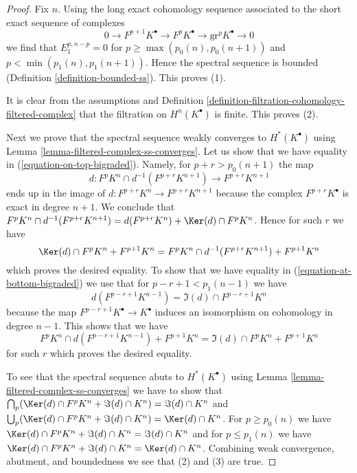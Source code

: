 \begin{proof}
Fix $n$. Using the long exact cohomology sequence associated to
the short exact sequence of complexes
$$
0 \to F^{p + 1}K^\bullet \to F^pK^\bullet \to \text{gr}^pK^\bullet \to 0
$$
we find that $E_1^{p, n - p} = 0$ for $p \geq \max(p_0(n), p_0(n + 1))$ and
$p < \min(p_1(n), p_1(n + 1))$. Hence the spectral sequence is bounded
(Definition \ref{definition-bounded-ss}). This proves (1).

\medskip\noindent
It is clear from the assumptions and
Definition \ref{definition-filtration-cohomology-filtered-complex}
that the filtration on $H^n(K^\bullet)$ is finite. This proves (2).

\medskip\noindent
Next we prove that the spectral sequence weakly converges to
$H^*(K^\bullet)$ using
Lemma \ref{lemma-filtered-complex-ss-converges}.
Let us show that we have equality in (\ref{equation-on-top-bigraded}).
Namely, for $p + r > p_0(n + 1)$ the map
$$
d : F^pK^{n} \cap d^{-1}(F^{p + r}K^{n + 1}) \to F^{p + r}K^{n + 1}
$$
ends up in the image of $d : F^{p + r}K^n \to F^{p + r}K^{n + 1}$
because the complex $F^{p + r}K^\bullet$ is exact in degree $n + 1$.
We conclude that $F^pK^{n} \cap d^{-1}(F^{p + r}K^{n + 1}) =
d(F^{p + r}K^n) + \Ker(d) \cap F^pK^n$. Hence for such $r$ we have
$$
\Ker(d) \cap F^pK^{n} + F^{p + 1}K^{n} =
F^pK^{n} \cap d^{-1}(F^{p + r}K^{n + 1}) + F^{p + 1}K^{n}
$$
which proves the desired equality. To show that we have equality in
(\ref{equation-at-bottom-bigraded}) we use that for $p - r + 1 < p_1(n - 1)$
we have
$$
d(F^{p - r + 1}K^{n - 1}) = \Im(d) \cap F^{p - r + 1}K^n
$$
because the map $F^{p - r + 1}K^\bullet \to K^\bullet$ induces an
isomorphism on cohomology in degree $n - 1$. This shows that
we have
$$
F^pK^{n} \cap d(F^{p - r + 1}K^{n - 1}) + F^{p + 1}K^{n} =
\Im(d) \cap F^pK^{n} + F^{p + 1}K^{n}
$$
for such $r$ which proves the desired equality.

\medskip\noindent
To see that the spectral sequence abuts to $H^*(K^\bullet)$ using
Lemma \ref{lemma-filtered-complex-ss-converges} we have to show that
$\bigcap_p (\Ker(d) \cap F^pK^n + \Im(d) \cap K^n) = \Im(d) \cap K^n$
and
$\bigcup_p (\Ker(d) \cap F^pK^n + \Im(d) \cap K^n) = \Ker(d) \cap K^n$.
For $p \geq p_0(n)$ we have
$\Ker(d) \cap F^pK^n + \Im(d) \cap K^n = \Im(d) \cap K^n$
and for $p \leq p_1(n)$ we have
$\Ker(d) \cap F^pK^n + \Im(d) \cap K^n = \Ker(d) \cap K^n$.
Combining weak convergence, abutment, and boundedness we see
that (2) and (3) are true.
\end{proof}























